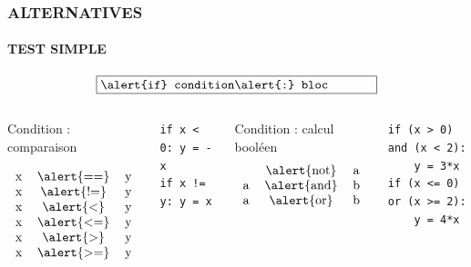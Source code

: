 \begin{frame}
\frametitle{\uppercase{Alternatives}}
\framesubtitle{\uppercase{Test simple}}
$$\fbox{\begin{minipage}{7.5cm}\tt
\alert{if} condition\alert{:} bloc
\end{minipage}}$$

\begin{columns}[T]

\column{5.25cm}

\begin{block}{Condition : comparaison}\tt

$$\begin{tabular}{ccc}
x & \alert{==} & y\\
x & \alert{!=} & y\\
x & \alert{\char`<}  & y\\
x & \alert{\char`<=} & y\\
x & \alert{>}  & y\\
x & \alert{>=} & y
\end{tabular}$$

\end{block}

{\tt \alert{if} x < 0\alert{:} y = -x }\\%
{\tt \alert{if} x != y\alert{:} y = x }

\column{5.25cm}

\begin{block}{Condition : calcul booléen}\tt
$$\begin{tabular}{ccc}
  & \alert{not} & a\\
a & \alert{and} & b\\
a & \alert{or}  & b
\end{tabular}$$

\end{block}

{\tt \alert{if} (x > 0) and (x < 2)\alert{:}\\
\mbox{}\ \ \ \ y = 3*x }\\%
{\tt \alert{if} (x <= 0) or (x >= 2)\alert{:}\\
\mbox{}\ \ \ \ y = 4*x }

\end{columns}

\end{frame}
\note{
}


